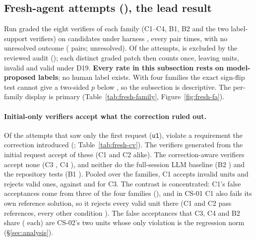 \subsection{Fresh-agent attempts (\texttt{\FRESHRUN}), the lead result}
\label{sec:results-fresh}
Run \texttt{\FRESHRUN} graded the eight verifiers of each family (C1--C4, B1, B2 and the two label-support verifiers) on  candidates under harness , every pair  times, with no unresolved outcome ( pairs;  unresolved). Of the  attempts,  is excluded by the reviewed audit (\texttt{}); each distinct graded patch then counts once, leaving  units,  invalid and  valid under D19. \textbf{Every rate in this subsection rests on model-proposed labels}; no human label exists. With four families the exact sign-flip test cannot give a two-sided $p$ below , so the subsection is descriptive. The per-family display is primary (Table~\ref{tab:fresh-family}, Figure~\ref{fig:fresh-fa}).


\paragraph{Initial-only verifiers accept what the correction ruled out.} Of the  attempts that saw only the first request (\texttt{u1}),  violate a requirement the correction introduced (; Table~\ref{tab:fresh-cv}). The verifiers generated from the initial request accept  of these  (C1 and C2 alike). The correction-aware verifiers accept none (C3 , C4 ), and neither do the full-session LLM baseline (B2 ) and the repository tests (B1 ). Pooled over the families, C1 accepts  invalid units and rejects  valid ones, against  and  for C3. The contrast is concentrated: C1's false acceptances come from three of the four families (), and in CS-01 C1 also fails its own reference solution, so it rejects every valid unit there (C1 and C2 pass  references, every other condition ). The false acceptances that C3, C4 and B2 share ( each) are CS-02's two units whose only violation is the regression norm (\S\ref{sec:analysis}).

